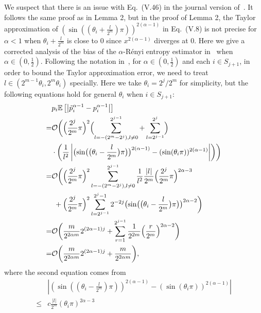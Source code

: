 \documentclass[journal]{IEEEtran}
\begin{document}
We suspect that there is an issue with Eq.~(V.46) in the journal version of~\cite{li2019entropy}. It follows the same proof as in Lemma 2, but in the proof of Lemma 2, the Taylor approximation of $\left(\sin \left(\left(\theta_i+\frac{l}{2^m}\right) \pi\right)\right)^{2(\alpha-1)}$ in Eq.~(V.8)   is not precise  for $\alpha < 1$ when $\theta_i + \frac{l}{2^m}$ is close to $0$ since $x^{2(\alpha-1)}$ diverges at $0$. Here we give a corrected analysis of the bias of the $\alpha$-R{\'e}nyi entropy estimator in~\cite{li2019entropy} when $\alpha \in (0,\frac{1}{2})$. Following the notation in~\cite{li2019entropy}, for $\alpha \in (0,\frac{1}{2})$ and each $i\in S_{j+1}$, in order to bound the Taylor approximation error, we need to treat $l\in(2^{m-1}\theta_i,2^m\theta_i)$ specially. Here we take $\theta_i = 2^j/2^m$ for simplicity, but the following equations hold for general $\theta_i$ when $i\in S_{j+1}$:
\begin{align}
    &p_i \mathbb{E}\left[\left|\tilde{p}_i^{\alpha-1}-p_i^{\alpha-1}\right|\right] \nonumber\\
    = &\mathcal{O}\biggl(\Bigl(\frac{2^j}{2^m}\pi\Bigr)^2\Bigl(\sum_{l= -(2^m-2^{j}),l\neq 0}^{2^{j-1}}+\sum_{l= 2^{j-1}}^{2^{j}}\Bigr)\biggr.\nonumber \\
    &\cdot\biggl.\left(\frac{1}{l^2}\left|\bigl(\sin\bigl(\bigl(\theta_i-\frac{l}{2^m}\bigr) \pi\bigr)\bigr)^{2(\alpha-1)}-(\sin (\theta_i \pi))^{2(\alpha-1)}\right|\right)\biggr) \nonumber\\
    = &\mathcal{O}\biggl(\Bigl(\frac{2^j}{2^m}\pi\Bigr)^2 \sum_{l=  -(2^m-2^{j}),l\neq 0}^{2^{j-1}}\frac{1}{l^2}\frac{|l|}{2^m}\Bigl(\frac{2^j}{2^m} \pi\Bigr)^{2 \alpha-3} \nonumber\\
    &\  +  \Bigl(\frac{2^j}{2^m}\pi\Bigr)^2 \sum_{l= 2^{j-1}}^{2^{j}-1}2^{-2j}\bigl(\sin\bigl(\bigl(\theta_i-\frac{l}{2^m}\bigr) \pi\bigr)\bigr)^{2\alpha-2}\biggr)\nonumber\\
    =&\mathcal{O}\biggl(\frac{m}{2^{2\alpha m}}2^{(2\alpha-1)j} + \sum_{r = 1}^{2^{j-1}}\frac{1}{2^{2m}}\Bigl(\frac{r}{2^m}\Bigr)^{2\alpha-2}\biggr)\nonumber\\
    =&\mathcal{O}\biggl(\frac{m}{2^{2\alpha m}}2^{(2\alpha-1)j} +\frac{m}{2^{2\alpha m}}\biggr),\label{eq:new_bias}
\end{align}
where the second equation comes from
\begin{align}
&\left|\left(\sin(\left(\theta_i-\frac{l}{2^m}\right)\pi)\right)^{2(\alpha-1)}-(\sin (\theta_i \pi))^{2(\alpha-1)}\right| \nonumber \\
\le & c\frac{|l|}{2^m}\left(\theta_i \pi\right)^{2 \alpha-3}
\end{align}
\end{document}
